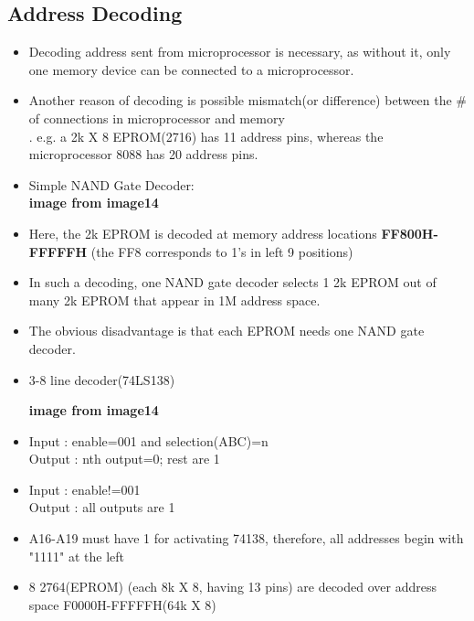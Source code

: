 \documentclass[12pt]{article}
\begin{document}
\subsection{Address Decoding}
\begin{itemize}
	\item Decoding address sent from microprocessor is necessary, as without it, only one memory device can be connected to a microprocessor.
	
	\item Another reason of decoding is possible mismatch(or difference) between the \# of connections in microprocessor and memory\\.
	e.g. a 2k X 8 EPROM(2716) has 11 address pins, whereas the microprocessor 8088 has 20 address pins.
	
	\item Simple NAND Gate Decoder:\\
	\textbf{image from image14}
	
	\item Here, the 2k EPROM is decoded at memory address locations \textbf{FF800H-FFFFFH} (the FF8 corresponds to 1's in left 9 positions)
	
	\item In such a decoding, one NAND gate decoder selects 1 2k EPROM out of many 2k EPROM that appear in 1M address space.
	
	\item The obvious disadvantage is that each EPROM needs one NAND gate decoder.
	
	\item 3-8 line decoder(74LS138)
	
	\textbf{image from image14}
	
	\item Input : enable=001 and selection(ABC)=n\\
	Output : nth output=0; rest are 1
	
	\item Input : enable!=001\\
	Output : all outputs are 1
	
	\item A16-A19 must have 1 for activating 74138, therefore, all addresses begin with "1111" at the left
	
	\item 8 2764(EPROM) (each 8k X 8, having 13 pins) are decoded over address space F0000H-FFFFFH(64k X 8) 
	
\end{itemize}
\end{document}
